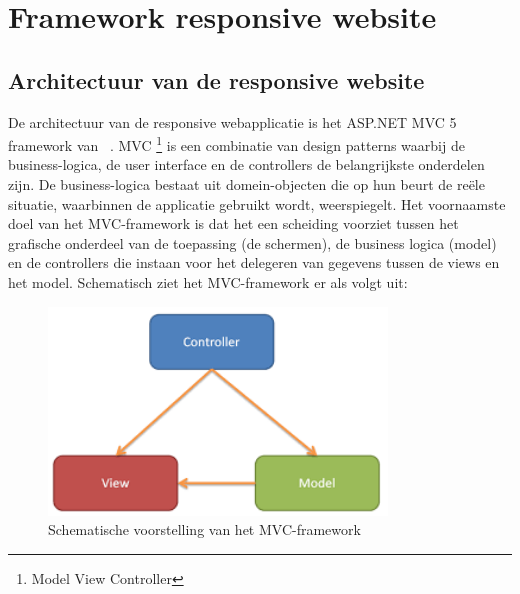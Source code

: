 \chapter{Framework responsive website}
\label{ch:frameworkresponsivewebsite}
\section{Architectuur van de responsive website}
De architectuur van de responsive webapplicatie is het ASP.NET MVC 5 framework van ~\cite{aspnetmvcoverview2017}.
MVC \footnote{Model View Controller} is een combinatie van design patterns waarbij de business-logica, de user interface en de controllers de belangrijkste
onderdelen zijn. De business-logica bestaat uit domein-objecten die op hun beurt de reële situatie, waarbinnen de applicatie
gebruikt wordt, weerspiegelt. Het voornaamste doel van het MVC-framework is dat het een scheiding voorziet tussen het grafische
onderdeel van de toepassing (de schermen), de business logica (model) en de controllers die instaan voor het delegeren van gegevens
tussen de views en het model. Schematisch ziet het MVC-framework er als volgt uit:
\begin{figure}[ht!]
\centering
\caption{Schematische voorstelling van het MVC-framework \cite{aspnetmvcoverview2017}}
\includegraphics[width=90mm]{./img/mvc.png}
\end{figure}
